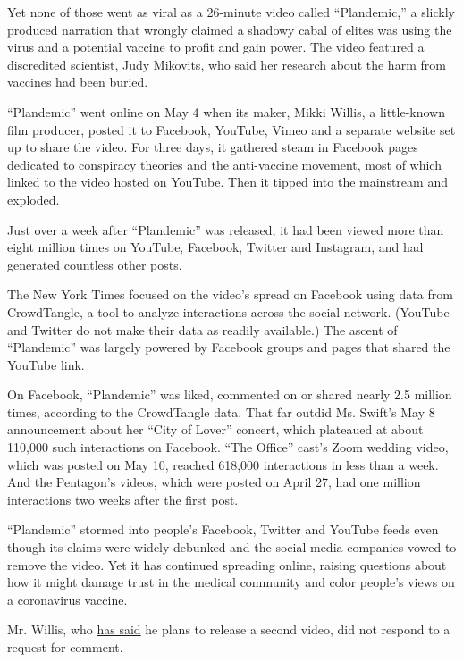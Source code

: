 Yet none of those went as viral as a 26-minute video called
``Plandemic,'' a slickly produced narration that wrongly claimed a
shadowy cabal of elites was using the virus and a potential vaccine to
profit and gain power. The video featured a
\href{https://www.nytimes.com/2020/05/09/technology/plandemic-judy-mikovitz-coronavirus-disinformation.html}{discredited
scientist, Judy Mikovits}, who said her research about the harm from
vaccines had been buried.

``Plandemic'' went online on May 4 when its maker, Mikki Willis, a
little-known film producer, posted it to Facebook, YouTube, Vimeo and a
separate website set up to share the video. For three days, it gathered
steam in Facebook pages dedicated to conspiracy theories and the
anti-vaccine movement, most of which linked to the video hosted on
YouTube. Then it tipped into the mainstream and exploded.

Just over a week after ``Plandemic'' was released, it had been viewed
more than eight million times on YouTube, Facebook, Twitter and
Instagram, and had generated countless other posts.

The New York Times focused on the video's spread on Facebook using data
from CrowdTangle, a tool to analyze interactions across the social
network. (YouTube and Twitter do not make their data as readily
available.) The ascent of ``Plandemic'' was largely powered by Facebook
groups and pages that shared the YouTube link.

On Facebook, ``Plandemic'' was liked, commented on or shared nearly 2.5
million times, according to the CrowdTangle data. That far outdid Ms.
Swift's May 8 announcement about her ``City of Lover'' concert, which
plateaued at about 110,000 such interactions on Facebook. ``The Office''
cast's Zoom wedding video, which was posted on May 10, reached 618,000
interactions in less than a week. And the Pentagon's videos, which were
posted on April 27, had one million interactions two weeks after the
first post.

``Plandemic'' stormed into people's Facebook, Twitter and YouTube feeds
even though its claims were widely debunked and the social media
companies vowed to remove the video. Yet it has continued spreading
online, raising questions about how it might damage trust in the medical
community and color people's views on a coronavirus vaccine.

Mr. Willis, who
\href{https://www.latimes.com/entertainment-arts/movies/story/2020-05-13/plandemic-coronavirus-documentary-director-mikki-willis-mikovits}{has
said} he plans to release a second video, did not respond to a request
for comment.

